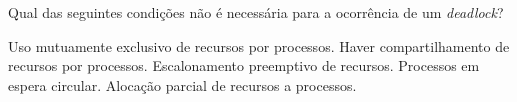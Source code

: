 \documentclass[12pt, addpoints]{exam}
\begin{document}
\begin{questions}
\question
Qual das seguintes condições não é necessária para a ocorrência de um \textit{deadlock}?

\begin{choices}
\choice Uso mutuamente exclusivo de recursos por processos.
\choice Haver compartilhamento de recursos por processos.
\choice Escalonamento preemptivo de recursos.
\choice Processos em espera circular.
\choice Alocação parcial de recursos a processos.
\end{choices}



    \end{questions}
    
\end{document}
